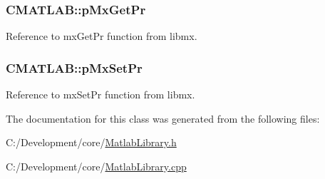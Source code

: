 \hypertarget{class_c_m_a_t_l_a_b_ab2647b823dd8a165c7109d0a927d457a}{
\subsubsection[{p\-Mx\-Get\-Pr}]{ C\-M\-A\-T\-L\-A\-B\-::p\-Mx\-Get\-Pr\hspace{0.3cm}{\ttfamily [private]}}}\label{class_c_m_a_t_l_a_b_ab2647b823dd8a165c7109d0a927d457a}


Reference to mx\-Get\-Pr function from libmx. 

\hypertarget{class_c_m_a_t_l_a_b_a3da6fa87a95db825e0785f4abd761351}{
\subsubsection[{p\-Mx\-Set\-Pr}]{ C\-M\-A\-T\-L\-A\-B\-::p\-Mx\-Set\-Pr\hspace{0.3cm}{\ttfamily [private]}}}\label{class_c_m_a_t_l_a_b_a3da6fa87a95db825e0785f4abd761351}


Reference to mx\-Set\-Pr function from libmx. 



The documentation for this class was generated from the following files\-:\begin{DoxyCompactItemize}
\item 
C\-:/\-Development/core/\hyperlink{_matlab_library_8h}{Matlab\-Library.\-h}\item 
C\-:/\-Development/core/\hyperlink{_matlab_library_8cpp}{Matlab\-Library.\-cpp}\end{DoxyCompactItemize}
